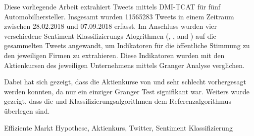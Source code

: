 Diese vorliegende Arbeit extrahiert Tweets mittels DMI-TCAT für fünf Automobilhersteller.
Insgesamt wurden 11565283 Tweets in einem Zeitraum zwischen 28.02.2018 und 07.09.2018 erfasst.
Im Anschluss wurden vier verschiedene Sentiment Klassifizierungs Alogrithmen (\tb{}, \nb{}, \me{} and \svm{}) auf die gesammelten Tweets angewandt, um Indikatoren für die öffentliche Stimmung zu den jeweiligen Firmen zu extrahieren.
Diese Indikatoren wurden mit den Aktienkursen des jeweiligen Unternehmens mittels Granger Analyse verglichen.

Dabei hat sich gezeigt, dass die Aktienkurse von \ford{} und \hyundai{} sehr schlecht vorhergesagt werden konnten, da nur ein einziger Granger Test signifikant war.
Weiters wurde gezeigt, dass die \svm{} und \nb{} Klassifizierungsalgorithmen dem Referenzalgorithmus \tb{} überlegen sind.

\SomeSpace
{}
\normalsize
\noindent
Effiziente Markt Hypothese, Aktienkurs, Twitter, Sentiment Klassifizierung

\glsresetall